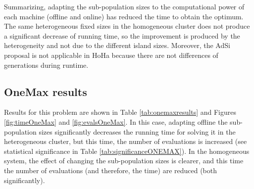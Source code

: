 \begin{table}
\end{table}



Summarizing, adapting the sub-population sizes to the computational
power of each machine (offline and online) has reduced the time to
obtain the optimum. The same heterogeneous fixed sizes in the
homogeneous cluster does not produce a significant decrease of running
time, so the improvement is produced by the heterogeneity and not due
to the different island sizes. Moreover, the AdSi proposal is not
applicable in HoHa because there are not differences of generations
during runtime. %

\subsection{OneMax results}

Results for this problem are shown in Table \ref{tab:onemaxresults} and Figures  \ref{fig:timeOneMax} and \ref{fig:evalsOneMax}. In this case, adapting offline the sub-population sizes significantly decreases  the running time for solving it in the heterogeneous cluster, but this time, the number of evaluations is increased (see statistical significance in Table \ref{tab:significanceONEMAX}). In the homogeneous system, the effect of changing the sub-population sizes is clearer, and this time the number of evaluations (and therefore, the time) are reduced (both significantly). 

